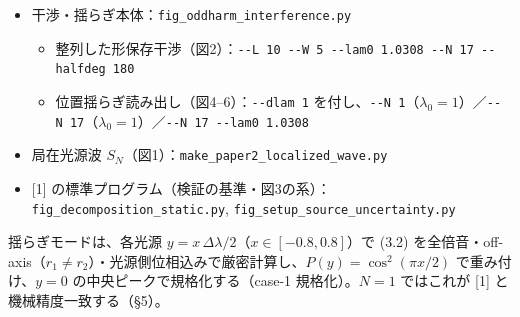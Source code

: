 \documentclass[
]{ltjsarticle}
\providecommand{\tightlist}{%
  \setlength{\itemsep}{0pt}\setlength{\parskip}{0pt}}
\begin{document}
\begin{itemize}
\tightlist
\item
  干渉・揺らぎ本体：\texttt{fig\_oddharm\_interference.py}

  \begin{itemize}
  \tightlist
  \item
    整列した形保存干渉（図2）：\texttt{-\/-L\ 10\ -\/-W\ 5\ -\/-lam0\ 1.0308\ -\/-N\ 17\ -\/-halfdeg\ 180}
  \item
    位置揺らぎ読み出し（図4--6）：\texttt{-\/-dlam\ 1}
    を付し、\texttt{-\/-N\ 1}（\(\lambda_0=1\)）／\texttt{-\/-N\ 17}（\(\lambda_0=1\)）／\texttt{-\/-N\ 17\ -\/-lam0\ 1.0308}
  \end{itemize}
\item
  局在光源波 \(S_N\)（図1）：\texttt{make\_paper2\_localized\_wave.py}
\item
  {[}1{]}
  の標準プログラム（検証の基準・図3の系）：\texttt{fig\_decomposition\_static.py},
  \texttt{fig\_setup\_source\_uncertainty.py}
\end{itemize}

揺らぎモードは、各光源 \(y=x\,\Delta\lambda/2\)（\(x\in[-0.8,0.8]\)）で
(3.2)
を全倍音・off-axis（\(r_1\neq r_2\)）・光源側位相込みで厳密計算し、\(P(y)=\cos^2(\pi x/2)\)
で重み付け、\(y=0\) の中央ピークで規格化する（case-1 規格化）。\(N=1\)
ではこれが {[}1{]} と機械精度一致する（§5）。
\end{document}
